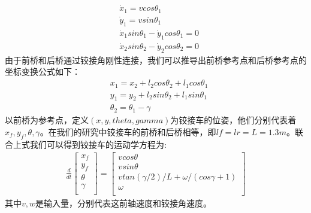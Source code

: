 \documentclass[master,academic]{ysuthesis} %
\begin{document}
		\begin{equation}
			\begin{aligned}
				&\dot{x}_1=vcos\theta _1\\
				&\dot{y}_1=vsin\theta _1\\
				&\dot{x}_1sin\theta _1-\dot{y}_1cos\theta _1=0\\
				&\dot{x}_2sin\theta _2-\dot{y}_2cos\theta _2=0
			\end{aligned}
		\end{equation}
		由于前桥和后桥通过铰接角刚性连接，我们可以推导出前桥参考点和后桥参考点的坐标变换公式如下：
		\begin{equation}
			\begin{aligned}
				&x_1=x_2+l_2cos\theta _2+l_1cos\theta _1\\
				&y_1=y_2+l_2sin\theta _2+l_1sin\theta _1\\
				&\theta _2=\theta _1-\gamma 
			\end{aligned}
		\end{equation}
		以前桥为参考点，定义$(x,y,theta,gamma)$为铰接车的位姿，他们分别代表着$x_f,y_f,\theta,\gamma$。在我们的研究中铰接车的前桥和后桥相等，即$lf=lr=L=1.3m$。联合上式我们可以得到铰接车的运动学方程为:
		\begin{equation}
			\begin{aligned}
				\frac{d}{dt}\left[ \begin{array}{c}
					x_f\\
					y_f\\
					\theta\\
					\gamma\\
				\end{array} \right] =\left[ \begin{array}{c}
					vcos\theta\\
					vsin\theta\\
					vtan( \gamma /2 ) /L+\omega /( cos\gamma +1 )\\
					\omega\\
				\end{array} \right] 
			\end{aligned}
		\end{equation}
		其中$v,w$是输入量，分别代表这前轴速度和铰接角速度。
\end{document}
